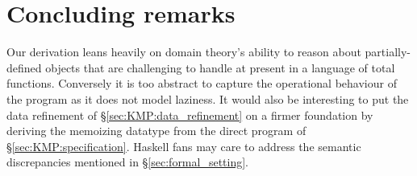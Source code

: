 \documentclass[11pt,a4paper]{article}
\begin{document}
\section{Concluding remarks}

Our derivation leans heavily on domain theory's ability to reason
about partially-defined objects that are challenging to handle at
present in a language of total functions. Conversely it is too
abstract to capture the operational behaviour of the program as it
does not model laziness. It would also be interesting to put the data
refinement of \S\ref{sec:KMP:data_refinement} on a firmer foundation
by deriving the memoizing datatype from the direct program of
\S\ref{sec:KMP:specification}. Haskell fans may care to address the
semantic discrepancies mentioned in \S\ref{sec:formal_setting}.




\end{document}
